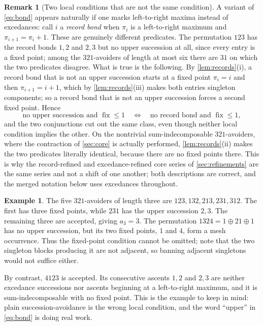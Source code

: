 \documentclass[11pt,letterpaper]{article}
\numberwithin{equation}{section}
\theoremstyle{definition}
\newtheorem{example}[theorem]{Example}
\newtheorem{remark}[theorem]{Remark}
\DeclareMathOperator{\fix}{fix}
\begin{document}
\begin{remark}[Two local conditions that are not the same condition]
\label{rem:records}
A variant of \eqref{eq:bond} appears naturally if one marks left-to-right
maxima instead of excedances: call $i$ a \emph{record bond} when $\pi_i$
is a left-to-right maximum and $\pi_{i+1}=\pi_i+1$. These are genuinely
different predicates. The permutation $123$ has the record bonds $1,2$
and $2,3$ but no upper succession at all, since every entry is a fixed
point; among the $321$-avoiders of length at most six there are $31$ on
which the two predicates disagree. What is true is the following.
By \cref{lem:records}(i), a record bond that is not an upper succession
starts at a fixed point $\pi_i=i$ and then $\pi_{i+1}=i+1$, which by
\cref{lem:records}(iii) makes both entries singleton components; so a
record bond that is not an upper succession forces a second fixed point.
Hence
\[
 \text{no upper succession and }\fix\le1
 \quad\Longleftrightarrow\quad
 \text{no record bond and }\fix\le1,
\]
and the two conjunctions cut out the same class, even though neither
local condition implies the other. On the nontrivial sum-indecomposable
$321$-avoiders, where the contraction of \cref{sec:core} is actually
performed, \cref{lem:records}(ii) makes the two predicates literally
identical, because there are no fixed points there. This is why the
record-refined and excedance-refined core series of \cref{sec:refinements}
are the same series and not a shift of one another; both descriptions are
correct, and the merged notation below uses excedances throughout.
\end{remark}

\begin{example}
The five $321$-avoiders of length three are
$123,132,213,231,312$. The first has three fixed points, while $231$ has
the upper succession $2,3$. The remaining three are accepted, giving
$a_3=3$. The permutation $1324=1\oplus21\oplus1$ has no upper succession, but its two
fixed points, $1$ and $4$, form a mesh occurrence. Thus the fixed-point
condition cannot be omitted; note that the two singleton blocks producing
it are not adjacent, so banning adjacent singletons would not suffice
either.

By contrast, $4123$ is accepted. Its consecutive ascents $1,2$ and $2,3$
are neither excedance successions nor ascents beginning at a left-to-right
maximum, and it is sum-indecomposable with no fixed point. This is the
example to keep in mind: plain succession-avoidance is the wrong local
condition, and the word ``upper'' in \eqref{eq:bond} is doing real work.
\end{example}
\end{document}
